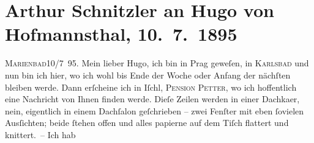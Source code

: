 

         
         \renewcommand{\erwaehntePersonen}{Personen: Josef von Bezecný, Moritz Broda, Antonín Dvořák, Ernst Hartmann, Hugo von Hofmannsthal, Anna Kallina,  Rudolf von Österreich-Ungarn, Wilhelmine Sandrock, Adolf von Sonnenthal}
         \renewcommand{\erwaehnteInstitutionen}{Institutionen: Čecho-slavische ethnographische Ausstellung}
         \renewcommand{\erwaehnteOrte}{Orte: Alter Jüdischer Friedhof, Böhmen, Franzensbad, Hodonín, Hotel und Pension Rudolfshöhe (Leopold Petter), Hradčany, Karlsbad, Marienbad, Polen, Prag}
         \renewcommand{\erwaehnteWerke}{Werke: Der arme Jonathan, Dimitrij, Ein Attaché, Hänsel und Grethel}
               \section[Arthur Schnitzler an Hugo von Hofmannsthal, 10. 7. 1895]{ Arthur Schnitzler an Hugo von Hofmannsthal, 10. 7. 1895}\nopagebreak{}\rehead{ }\begin{ledgroupsized}[t]{13cm}\normalsize\beginnumbering \toendnotes[C]{\smallbreak\pagebreak[2]} 
\toendnotes[C]{\smallbreak}\pstart
           \raggedleft{}{\pb}\textsc{Marienbad}10/7 95.\pend
           \pstart{}Mein lieber Hugo,\pend\pstart
           ich bin in Prag geweſen, in \textsc{Karlsbad} und nun bin ich hier, wo ich wohl bis Ende der Woche oder Anfang der nächſten
               bleiben werde. Dann erſcheine ich in Iſchl, \textsc{Pension Petter}, wo ich hoffentlich eine Nachricht von Ihnen finden werde. Dieſe Zeilen werden
               in einer Dachka{\geminationm}er, nein, eigentlich in einem Dachſalon
               geſchrieben – zwei Fenſter mit eben ſovielen Ausſichten; beide ſtehen offen und alles
               papierne {\pb}auf dem Tiſch flattert und knittert. – Ich hab

\end{ledgroupsized}
